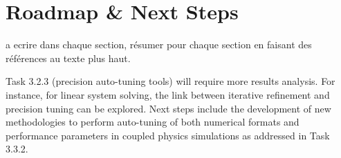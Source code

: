 \section{Roadmap \& Next Steps}

a ecrire dans chaque section, résumer pour chaque section en faisant des références au texte plus haut.

Task 3.2.3 (precision auto-tuning tools) will require 
more results analysis. For instance, for linear system solving, the link between iterative refinement and precision tuning can be explored.
Next steps include the development of new methodologies to perform auto-tuning of both numerical formats and performance parameters in coupled physics simulations as addressed in Task 3.3.2.










